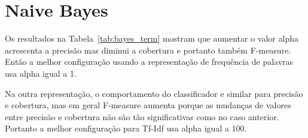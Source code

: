 \section{Naive Bayes}
\label{sec:bayes}

Os resultados na Tabela~\ref{tab:bayes_term} mostram que aumentar o valor alpha acrescenta a precisão mas diminui a cobertura e portanto também F-measure. Então a melhor configuração usando a representação de frequência de palavras usa alpha igual a 1.



Na outra representação, o comportamento do classificador e similar para precisão e cobertura, mas em geral F-measure aumenta porque as mudanças de valores entre precisão e cobertura não são tão significativas como no caso anterior. Portanto a melhor configuração para Tf-Idf usa alpha igual a 100.

